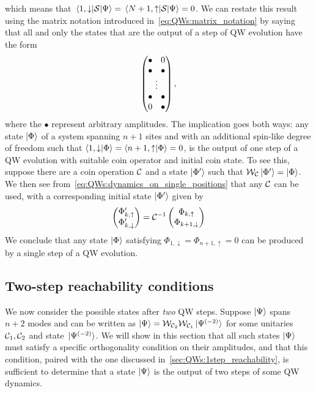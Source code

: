 which means that $\mel{1,\downarrow}{{\mathcal{S}}}{\Psi}=\mel{N+1,\uparrow}{{\mathcal{S}}}{\Psi}=0$.
We can restate this result using the matrix notation introduced in~\cref{eq:QWs:matrix_notation} by saying that all and only the states that are the output of a step of \ac{QW} evolution have the form
\begin{equation}
    \begin{pmatrix}
        \bullet & 0 \\
        \bullet & \bullet \\
        \multicolumn{2}{c}{\vdots} \\ 
        \bullet & \bullet \\
        0 & \bullet \\
    \end{pmatrix},
    \label{eq:QWs:matrix_notation_vanishing_endpoints}
\end{equation}
where the $\bullet$ represent arbitrary amplitudes.
The implication goes both ways: any state $\ket\Phi$ of a system spanning $n+1$ sites and with an additional spin-like degree of freedom such that
$
\braket{1, \downarrow}{\Phi} =
\braket{n+1, \uparrow}{\Phi} = 0
$,
is the output of one step of a QW evolution with suitable coin operator and initial coin state.
To see this, suppose there are a coin operation ${\mathcal{C}}$ and a state $\ket{\Phi'}$ such that ${\mathcal{W}}_{\mathcal{C}}\ket{\Phi'}=\ket{\Phi}$.
We then see from~\cref{eq:QWs:dynamics_on_single_positions} that any ${\mathcal{C}}$ can be used, with a corresponding initial state $\ket{\Phi'}$ given by
\begin{equation}
    \begin{pmatrix}
        \Phi'_{k,\uparrow} \\
        \Phi'_{k,\downarrow}
    \end{pmatrix} = {\mathcal{C}}^{-1}
    \begin{pmatrix}
        \Phi_{k,\uparrow} \\
        \Phi_{k+1,\downarrow}
    \end{pmatrix}
\end{equation}
We conclude that any state $\ket\Phi$ satisfying $\Phi_{1,\downarrow}=\Phi_{n+1,\uparrow}=0$ can be produced by a single step of a QW evolution.

\subsection{Two-step reachability conditions}
\label{sec:QWs:2step_reachability}
We now consider the possible states after \textit{two} \ac{QW} steps.
Suppose $\ket\Psi$ spans $n+2$ modes and can be written as
$\ket\Psi={\mathcal{W}}_{{\mathcal{C}}_2}{\mathcal{W}}_{{\mathcal{C}}_1}\ket*{\Psi^{(-2)}}$
for some unitaries ${\mathcal{C}}_1,{\mathcal{C}}_2$ and state $\ket*{\Psi^{(-2)}}$.
We will show in this section that all such states $\ket\Psi$ must satisfy a specific orthogonality condition on their amplitudes, and that this condition, paired with the one discussed in~\cref{sec:QWs:1step_reachability}, is sufficient to determine that a state $\ket\Psi$ is the output of two steps of some \ac{QW} dynamics.


